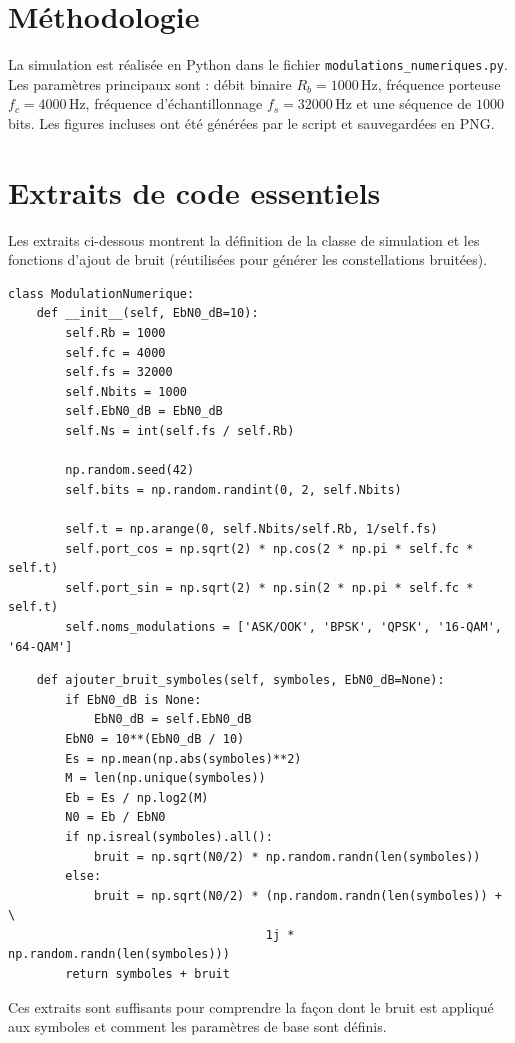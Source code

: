 \documentclass[11pt,a4paper,twocolumn]{article}
\begin{document}
\section*{Méthodologie}
La simulation est réalisée en Python dans le fichier \texttt{modulations\_numeriques.py}. Les paramètres principaux sont : débit binaire $R_b=1000\,$Hz, fréquence porteuse $f_c=4000\,$Hz, fréquence d'échantillonnage $f_s=32000\,$Hz et une séquence de $1000$ bits. Les figures incluses ont été générées par le script et sauvegardées en PNG.

\section*{Extraits de code essentiels}
Les extraits ci-dessous montrent la définition de la classe de simulation et les fonctions d'ajout de bruit (réutilisées pour générer les constellations bruitées).

\begin{lstlisting}
class ModulationNumerique:
    def __init__(self, EbN0_dB=10):
        self.Rb = 1000
        self.fc = 4000
        self.fs = 32000
        self.Nbits = 1000
        self.EbN0_dB = EbN0_dB
        self.Ns = int(self.fs / self.Rb)

        np.random.seed(42)
        self.bits = np.random.randint(0, 2, self.Nbits)

        self.t = np.arange(0, self.Nbits/self.Rb, 1/self.fs)
        self.port_cos = np.sqrt(2) * np.cos(2 * np.pi * self.fc * self.t)
        self.port_sin = np.sqrt(2) * np.sin(2 * np.pi * self.fc * self.t)
        self.noms_modulations = ['ASK/OOK', 'BPSK', 'QPSK', '16-QAM', '64-QAM']
\end{lstlisting}

\begin{lstlisting}
    def ajouter_bruit_symboles(self, symboles, EbN0_dB=None):
        if EbN0_dB is None:
            EbN0_dB = self.EbN0_dB
        EbN0 = 10**(EbN0_dB / 10)
        Es = np.mean(np.abs(symboles)**2)
        M = len(np.unique(symboles))
        Eb = Es / np.log2(M)
        N0 = Eb / EbN0
        if np.isreal(symboles).all():
            bruit = np.sqrt(N0/2) * np.random.randn(len(symboles))
        else:
            bruit = np.sqrt(N0/2) * (np.random.randn(len(symboles)) + \
                                    1j * np.random.randn(len(symboles)))
        return symboles + bruit
\end{lstlisting}

Ces extraits sont suffisants pour comprendre la façon dont le bruit est appliqué aux symboles et comment les paramètres de base sont définis.
\end{document}
